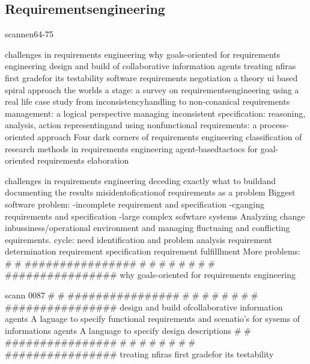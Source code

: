 \subsection{Requirementsengineering}


scannen64-75

challenges in requirements engineering
why goals-oriented for requirements engineering
design and build of collaborative information agents
treating nfiras first gradefor its testability
software requirements negotiation a theory ui based spiral approach
the worlds a stage: a survey on requirementsengineering using a real life case study
from inconsistencyhandling to non-conanical requirements management: a logical perspective
managing inconsistent specification: reasoning, analysis, action
representingand using nonfunctional requirements: a process-oriented approach
Four dark corners of requirements engineering
classification of research methods in requirements engineering
agent-basedtactocs for goal-oriented requirements elaboration


challenges in requirements engineering
deceding exactly what to buildand documenting the results
misidentoficationof requirements as a problem
Biggest software problem:
-incomplete requirement and specification
-cganging requirements and specification
-large complex sofwtare systems
Analyzing change inbussiness/operational environment and managing fluctuaing and conflicting equirements.
cycle:
need identification and problem analysis
requirement determination
requirement specification
requirement fulfilllment
More problems:
# # ################
# # #
# # #
# # ################
why goals-oriented for requirements engineering

scann 0087
# # ################
# # #
# # #
# # ################
design and build ofcollaborative information agents
A laguage to specify functional requirements and scenatio's for sysems of informations agents
A language to specify design descriptions
# # ################
# # #
# # #
# # ################
treating nfiras first gradefor its testability

